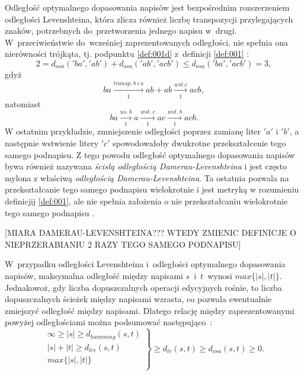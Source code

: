 \documentclass{praca1}
\begin{document}
Odległość optymalnego dopasowania napisów jest bezpośrednim rozszerzeniem odległości Levenshteina, która zlicza również liczbę transpozycji przylegających znaków, potrzebnych do~przetworzenia jednego napisu w~drugi. W~przeciwieństwie do~wcześniej zaprezentowanych odległości, nie spełnia ona nierówności trójkąta, tj. podpunktu \ref{def:001d} z~definicji \ref{def:001} \cite{Loo2014:stringdist}: 
$$2 = d_{osa}('ba', 'ab') + d_{osa}('ab', 'acb') \leq d_{osa}('ba', 'acb') = 3,$$ 
gdyż
$$
ba  \xrightarrow[1]{transp.\ b\ i \ a} ab + ab \xrightarrow[1]{wst. c} acb,
$$
natomiast
$$
ba  \xrightarrow[1]{us.\ b} a \xrightarrow[1]{wst.\ c} ac \xrightarrow[1]{wst.\ b} acb.
$$
W ostatnim przykładzie, zmniejszenie odległości poprzez zamianę liter $'a'$ i $'b'$, a następnie wstwienie litery $'c'$ spowodowałoby dwukrotne przekształcenie tego samego podnapisu. Z tego powodu odległość optymalnego dopasowania napisów bywa również nazywana \emph{ścisłą odległością Damerau-Levenshteina} i jest często mylona z właściwą \emph{odległością Damerau-Levenshteina}. Ta ostatnia pozwala na przekształcanie tego samego podnapisu wielokrotnie i jest metryką w rozumieniu definicjij \ref{def:001}, ale nie spełnia założenia o nie przekształcaniu wielokrotnie tego samego podnapisu \cite{Loo2014:stringdist}.

[MIARA DAMERAU-LEVENSHTEINA??? WTEDY ZMIENIC DEFINICJE O NIEPRZERABIANIU 2 RAZY TEGO SAMEGO PODNAPISU]

W~przypadku odległości Levenshteina i~odległości optymalnego dopasowania napisów, maksymalna odległość między napisami $s$~i~$t$~wynosi $max\{|s|, |t|\}$. Jednakowoż, gdy liczba dopuszczalnych operacji edycyjnych rośnie, to liczba dopuszczalnych ścieżek między napisami wzrasta, co pozwala ewentualnie zmiejszyć odległość między napisami. Dlatego relację między zaprezentowanymi powyżej odległościami można podsumować następująco~\cite{Loo2014:stringdist}:
$$
\left. \begin{array}{r}
\infty \geq |s| \geq d_{hamming}(s,t) \\
|s| + |t| \geq d_{lcs}(s,t) \\
max\{|s|, |t|\} \\
\end{array} \right \}
\geq d_{lv}(s,t) \geq d_{osa}(s,t) \geq 0.
$$

\end{document}
